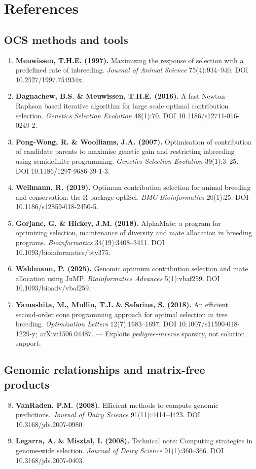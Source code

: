 \documentclass[11pt]{article}
\begin{document}
\section*{References}
\sloppy

\subsection*{OCS methods and tools}
\begin{enumerate}
\item \textbf{Meuwissen, T.H.E. (1997).} Maximizing the response of selection with a predefined rate of inbreeding. \emph{Journal of Animal Science} 75(4):934--940. DOI 10.2527/1997.754934x.
\item \textbf{Dagnachew, B.S. \& Meuwissen, T.H.E. (2016).} A fast Newton--Raphson based iterative algorithm for large scale optimal contribution selection. \emph{Genetics Selection Evolution} 48(1):70. DOI 10.1186/s12711-016-0249-2.
\item \textbf{Pong-Wong, R. \& Woolliams, J.A. (2007).} Optimisation of contribution of candidate parents to maximise genetic gain and restricting inbreeding using semidefinite programming. \emph{Genetics Selection Evolution} 39(1):3--25. DOI 10.1186/1297-9686-39-1-3.
\item \textbf{Wellmann, R. (2019).} Optimum contribution selection for animal breeding and conservation: the R package optiSel. \emph{BMC Bioinformatics} 20(1):25. DOI 10.1186/s12859-018-2450-5.
\item \textbf{Gorjanc, G. \& Hickey, J.M. (2018).} AlphaMate: a program for optimizing selection, maintenance of diversity and mate allocation in breeding programs. \emph{Bioinformatics} 34(19):3408--3411. DOI 10.1093/bioinformatics/bty375.
\item \textbf{Waldmann, P. (2025).} Genomic optimum contribution selection and mate allocation using JuMP. \emph{Bioinformatics Advances} 5(1):vbaf259. DOI 10.1093/bioadv/vbaf259.
\item \textbf{Yamashita, M., Mullin, T.J. \& Safarina, S. (2018).} An efficient second-order cone programming approach for optimal selection in tree breeding. \emph{Optimization Letters} 12(7):1683--1697. DOI 10.1007/s11590-018-1229-y; arXiv:1506.04487. --- Exploits \emph{pedigree-inverse} sparsity, not solution support.
\end{enumerate}

\subsection*{Genomic relationships and matrix-free products}
\begin{enumerate}\setcounter{enumi}{7}
\item \textbf{VanRaden, P.M. (2008).} Efficient methods to compute genomic predictions. \emph{Journal of Dairy Science} 91(11):4414--4423. DOI 10.3168/jds.2007-0980.
\item \textbf{Legarra, A. \& Misztal, I. (2008).} Technical note: Computing strategies in genome-wide selection. \emph{Journal of Dairy Science} 91(1):360--366. DOI 10.3168/jds.2007-0403.
\end{enumerate}
\end{document}
